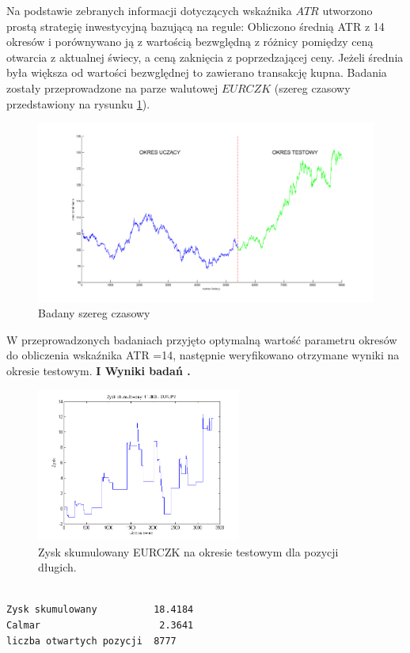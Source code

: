 Na podstawie zebranych informacji dotyczących wskaźnika $ATR$ utworzono prostą strategię inwestycyjną bazującą na regule: Obliczono średnią ATR z 14 okresów i porównywano ją z wartością bezwględną z różnicy pomiędzy ceną otwarcia z aktualnej świecy, a ceną zaknięcia z poprzedzającej ceny. Jeżeli średnia była większa od wartości bezwględnej to zawierano transakcję kupna. Badania zostały przeprowadzone na parze walutowej $EURCZK$ (szereg czasowy przedstawiony na rysunku \ref{rysunek2}). \\
\begin{figure}[h!]
\centering
\includegraphics[width = \textwidth]{podzialDanych.png}
\caption{Badany szereg czasowy}
\label{rysunek2}
\end{figure}
\FloatBarrier
W przeprowadzonych badaniach przyjęto optymalną wartość parametru okresów do obliczenia wskaźnika ATR =14, następnie weryfikowano otrzymane wyniki na okresie testowym. 
\newpage
\noindent \textbf{I Wyniki badań .}\\
\begin{figure}[h!]
\centering
\includegraphics[width = 0.6\textwidth]{ROC_EURJPY_LS_SearchBestK_zysk.png}
\caption{Zysk skumulowany EURCZK na okresie testowym dla pozycji długich. }
\end{figure}
\FloatBarrier
\begin{verbatim}

Zysk skumulowany          18.4184
Calmar                     2.3641
liczba otwartych pozycji  8777




\end{verbatim}
%
